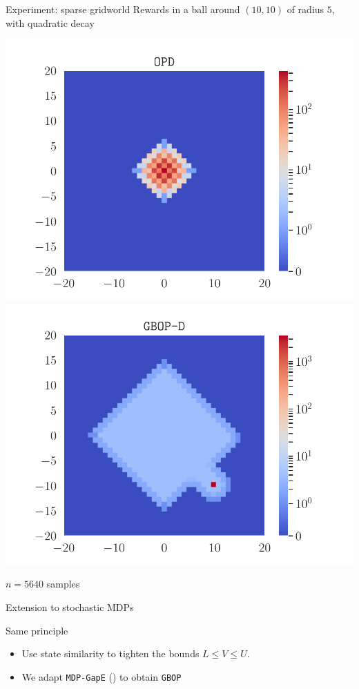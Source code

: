 \documentclass[slideopt,A4,showboxes,svgnames]{beamer}
\begin{document}
\begin{frame}{Experiment: sparse gridworld}
Rewards in a ball around $(10, 10)$ of radius $5$, with quadratic decay
\begin{center}
	\includegraphics[trim={1.8cm 0.4cm 1.8cm 0.7cm}, clip, width=0.43\linewidth]{../img/occupations_OPD.pdf}
	\includegraphics[trim={1.8cm 0.4cm 1.8cm 0.7cm}, clip, width=0.43\linewidth]{../img/occupations_GBOP-D.pdf}

	$n = 5640$ samples
\end{center}
\end{frame}

\begin{frame}{Extension to stochastic MDPs}
\begin{exampleblock}{Same principle}
\begin{itemize}
	\item Use state similarity to \alert{tighten} the bounds $L\leq V\leq U$.
	\item We adapt \texttt{MDP-GapE} (\cite{Jonsson2020planning}) to obtain \texttt{GBOP}
\end{itemize}
\end{exampleblock}
\end{frame}
\end{document}
